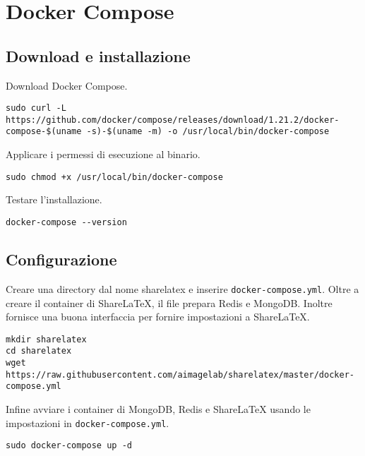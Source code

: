\section{Docker Compose}
\subsection{Download e installazione}
Download Docker Compose.
\begin{lstlisting}
sudo curl -L https://github.com/docker/compose/releases/download/1.21.2/docker-compose-$(uname -s)-$(uname -m) -o /usr/local/bin/docker-compose
\end{lstlisting}
Applicare i permessi di esecuzione al binario.
\begin{lstlisting}
sudo chmod +x /usr/local/bin/docker-compose
\end{lstlisting}
Testare l'installazione.
\begin{lstlisting}
docker-compose --version
\end{lstlisting}

\subsection{Configurazione}
Creare una directory dal nome sharelatex e inserire \verb|docker-compose.yml|. Oltre a creare il container di ShareLaTeX, il file prepara Redis e MongoDB. Inoltre fornisce una buona interfaccia per fornire impostazioni a ShareLaTeX.
\begin{lstlisting}
mkdir sharelatex
cd sharelatex
wget https://raw.githubusercontent.com/aimagelab/sharelatex/master/docker-compose.yml
\end{lstlisting}
Infine avviare i container di MongoDB, Redis e ShareLaTeX usando le impostazioni in \verb|docker-compose.yml|.
\begin{lstlisting}
sudo docker-compose up -d
\end{lstlisting}

